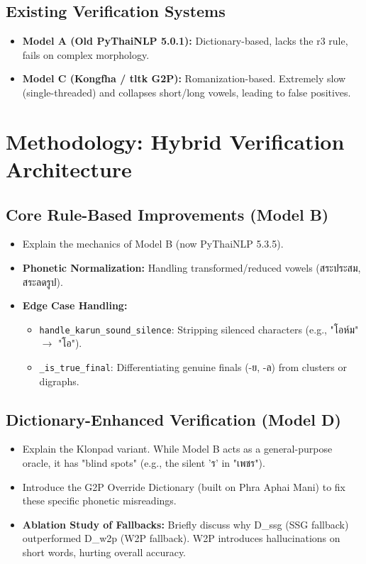 \documentclass[conference]{IEEEtran}
\begin{document}
\subsection{Existing Verification Systems}
\begin{itemize}
    \item \textbf{Model A (Old PyThaiNLP 5.0.1):} Dictionary-based, lacks the r3 rule, fails on complex morphology.
    \item \textbf{Model C (Kongfha / tltk G2P):} Romanization-based. Extremely slow (single-threaded) and collapses short/long vowels, leading to false positives.
\end{itemize}

\section{Methodology: Hybrid Verification Architecture}
\subsection{Core Rule-Based Improvements (Model B)}
\begin{itemize}
    \item Explain the mechanics of Model B (now PyThaiNLP 5.3.5).
    \item \textbf{Phonetic Normalization:} Handling transformed/reduced vowels (สระประสม, สระลดรูป).
    \item \textbf{Edge Case Handling:} 
        \begin{itemize}
            \item \texttt{handle\_karun\_sound\_silence}: Stripping silenced characters (e.g., "โอห์ม" $\rightarrow$ "โอ").
            \item \texttt{\_is\_true\_final}: Differentiating genuine finals (-ย, -ล) from clusters or digraphs.
        \end{itemize}
\end{itemize}

\subsection{Dictionary-Enhanced Verification (Model D)}
\begin{itemize}
    \item Explain the Klonpad variant. While Model B acts as a general-purpose oracle, it has "blind spots" (e.g., the silent 'ร' in "เพชร").
    \item Introduce the G2P Override Dictionary (built on Phra Aphai Mani) to fix these specific phonetic misreadings.
    \item \textbf{Ablation Study of Fallbacks:} Briefly discuss why D\_ssg (SSG fallback) outperformed D\_w2p (W2P fallback). W2P introduces hallucinations on short words, hurting overall accuracy.
\end{itemize}
\end{document}

